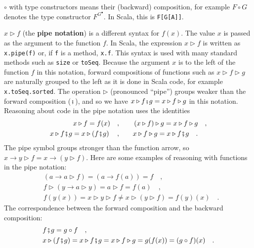 $\circ$ with type constructors means their (backward) composition,
for example $F\circ G$ denotes the type constructor $F^{G^{\bullet}}$.
In Scala, this is \lstinline!F[G[A]]!. 

$x\triangleright f$ (the \textbf{pipe notation})
is a different syntax for $f(x)$. The value $x$ is passed as the
argument to the function $f$. In Scala, the expression $x\triangleright f$
is written as \lstinline!x.pipe(f)! or, if \lstinline!f! is a method,
\lstinline!x.f!. This syntax is used with many standard methods such
as \lstinline!size! or \lstinline!toSeq!. Because the argument $x$
is to the left of the function $f$ in this notation, forward compositions
of functions such as $x\triangleright f\triangleright g$ are naturally
grouped to the left as it is done in Scala code, for example \lstinline!x.toSeq.sorted!.
The operation $\triangleright$ (pronounced \textsf{``}pipe\textsf{''}) groups weaker
than the forward composition ($\bef$), and so we have $x\triangleright f\bef g=x\triangleright f\triangleright g$
in this notation. Reasoning about code in the pipe notation uses the
identities
\begin{align*}
x\triangleright f=f(x)\quad,\quad\quad & \left(x\triangleright f\right)\triangleright g=x\triangleright f\triangleright g\quad,\\
x\triangleright f\bef g=x\triangleright\left(f\bef g\right)\quad,\quad\quad & x\triangleright f\triangleright g=x\triangleright f\bef g\quad.
\end{align*}
The pipe symbol groups stronger than the function arrow, so $x\rightarrow y\triangleright f=x\rightarrow(y\triangleright f)$.
Here are some examples of reasoning with functions in the pipe notation:
\begin{align*}
 & \left(a\rightarrow a\triangleright f\right)=\left(a\rightarrow f(a)\right)=f\quad,\\
 & f\triangleright\left(y\rightarrow a\triangleright y\right)=a\triangleright f=f(a)\quad,\\
 & f(y(x))=x\triangleright y\triangleright f\neq x\triangleright\left(y\triangleright f\right)=f(y)(x)\quad.
\end{align*}
The correspondence between the forward composition and the backward
composition:
\begin{align*}
 & f\bef g=g\circ f\quad,\\
 & x\triangleright(f\bef g)=x\triangleright f\bef g=x\triangleright f\triangleright g=g(f(x))=(g\circ f)(x)\quad.
\end{align*}

